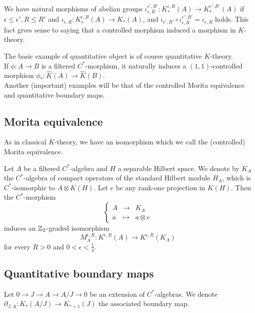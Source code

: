 We have natural morphisms of abelian groups $\iota_{\epsilon,R}^{\epsilon',R'} : K_*^{\epsilon,R}(A)\rightarrow K^{\epsilon',R'}_*(A)$ if $\epsilon\leq\epsilon', R\leq R'$ and $\iota_{\epsilon,R} : K_*^{\epsilon,R}(A)\rightarrow K_*(A)$, and $\iota_{\epsilon',R'}\circ\iota_{\epsilon,R}^{\epsilon',R'}=\iota_{\epsilon,R}$ holds. This fact gives sense to saying that a controlled morphism induced a morphism in $K$-theory. 

\begin{Expl}
The basic example of quantitative object is of course quantitative $K$-theory.\\
If $\phi : A \rightarrow B$ is a filtered $C^*$-morphism, it naturally induces a $(1,1)$-controlled morphism $\phi_* : \hat K(A)\rightarrow \hat K(B)$.\\
Another (important) examples will be that of the controlled Morita equivalence and quantitative boundary maps. 
\end{Expl}

\subsection{Morita equivalence}

As in classical $K$-theory, we have an isomorphism which we call the (controlled) Morita equivalence.
\begin{prop}
Let $A$ be a filtered $C^*$-algebra and $H$ a separable Hilbert space. We denote by $K_A$ the $C^*$-algebra of compact operators of the standard Hilbert module $H_A$, which is $C^*$-isomorphic to $A\otimes K(H)$. Let $e$ be any rank-one projection in $K(H)$. Then the $C^*$-morphism 
\[\left\{\begin{array}{lll} A & \rightarrow & K_A \\ a &\mapsto & a\otimes e\end{array}\right.\]
induces an $\mathbb Z_2$-graded isomorphism
\[M_A^{\epsilon, R} : K^{\epsilon , R}(A)\rightarrow K^{\epsilon , R}(K_A)\]
for every $R>0$ and $0< \epsilon <\frac{1}{4}$.
\end{prop}

\subsection{Quantitative boundary maps}

Let $0\rightarrow J \rightarrow A\rightarrow A/J\rightarrow 0$ be an extension of $C^*$-algebras. We denote $\partial_{J,A}: K_*(A/J)\rightarrow K_{*+1}(J)$ the associated boundary map.

